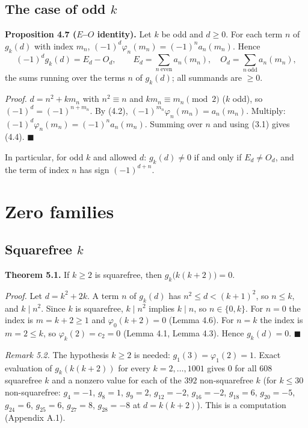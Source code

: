 \subsection{\texorpdfstring{The case of odd \(k\)}{The case of odd k}}\label{the-case-of-odd-k}

\textbf{Proposition 4.7 (\(E\)--\(O\) identity).} Let \(k\) be odd and \(d\ge0\). For each term \(n\) of \(g_k(d)\) with index \(m_n\), \((-1)^d\varphi_n(m_n)=(-1)^n a_n(m_n)\). Hence
\[(-1)^d g_k(d)=E_d-O_d,\qquad E_d=\sum_{n\ \mathrm{even}}a_n(m_n),\quad O_d=\sum_{n\ \mathrm{odd}}a_n(m_n),\tag{4.4}\]
the sums running over the terms \(n\) of \(g_k(d)\); all summands are \(\ge0\).

\emph{Proof.} \(d=n^2+km_n\) with \(n^2\equiv n\) and \(km_n\equiv m_n\pmod 2\) (\(k\) odd), so \((-1)^d=(-1)^{n+m_n}\). By (4.2), \((-1)^{m_n}\varphi_n(m_n)=a_n(m_n)\). Multiply: \((-1)^d\varphi_n(m_n)=(-1)^na_n(m_n)\). Summing over \(n\) and using (3.1) gives (4.4). \(\blacksquare\)

In particular, for odd \(k\) and allowed \(d\): \(g_k(d)\ne0\) if and only if \(E_d\ne O_d\), and the term of index \(n\) has sign \((-1)^{d+n}\).

\section{Zero families}\label{zero-families}

\subsection{\texorpdfstring{Squarefree \(k\)}{Squarefree k}}\label{squarefree-k}

\textbf{Theorem 5.1.} If \(k\ge2\) is squarefree, then \(g_k\bigl(k(k+2)\bigr)=0\).

\emph{Proof.} Let \(d=k^2+2k\). A term \(n\) of \(g_k(d)\) has \(n^2\le d<(k+1)^2\), so \(n\le k\), and \(k\mid n^2\). Since \(k\) is squarefree, \(k\mid n^2\) implies \(k\mid n\), so \(n\in\{0,k\}\). For \(n=0\) the index is \(m=k+2\ge1\) and \(\varphi_0(k+2)=0\) (Lemma 4.6). For \(n=k\) the index is \(m=2\le k\), so \(\varphi_k(2)=c_2=0\) (Lemma 4.1, Lemma 4.3). Hence \(g_k(d)=0\). \(\blacksquare\)

\emph{Remark 5.2.} The hypothesis \(k\ge2\) is needed: \(g_1(3)=\varphi_1(2)=1\). Exact evaluation of \(g_k(k(k+2))\) for every \(k=2,\dots,1001\) gives \(0\) for all \(608\) squarefree \(k\) and a nonzero value for each of the \(392\) non-squarefree \(k\) (for \(k\le 30\) non-squarefree: \(g_4=-1\), \(g_8=1\), \(g_9=2\), \(g_{12}=-2\), \(g_{16}=-2\), \(g_{18}=6\), \(g_{20}=-5\), \(g_{24}=6\), \(g_{25}=6\), \(g_{27}=8\), \(g_{28}=-8\) at \(d=k(k+2)\)). This is a computation (Appendix A.1).

